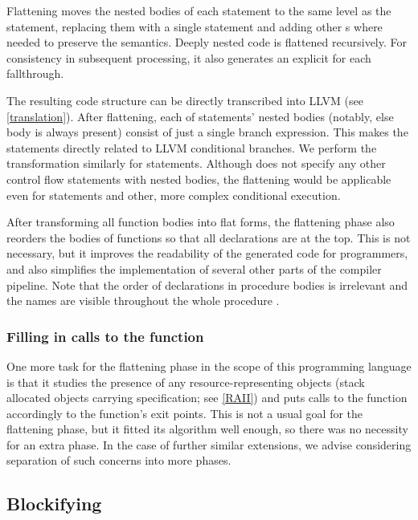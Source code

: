 Flattening moves the nested bodies of each  statement to the same level as the  statement, replacing them with a single  statement and adding other s where needed to preserve the semantics. Deeply nested code is flattened recursively. For consistency in subsequent processing, it also generates an explicit  for each fallthrough.

The resulting code structure can be directly transcribed into LLVM (see \cref{translation}). After flattening, each of  statements' nested bodies (notably, else body is always present) consist of just a single branch expression. This makes the  statements directly related to LLVM conditional branches. We perform the transformation similarly for  statements. Although \cmm does not specify any other control flow statements with nested bodies, the flattening would be applicable even for  statements and other, more complex conditional execution.

After transforming all function bodies into flat forms, the flattening phase also reorders the bodies of functions so that all declarations are at the top. This is not necessary, but it improves the readability of the generated code for programmers, and also simplifies the implementation of several other parts of the compiler pipeline. Note that the order of declarations in procedure bodies is irrelevant and the names are visible throughout the whole procedure \cite{ramsey2005c}.

\subsubsection{Filling in calls to the  function}

One more task for the flattening phase in the scope of this programming language is that it studies the presence of any resource-representing objects (stack allocated objects carrying  specification; see \cref{RAII}) and puts calls to the  function accordingly to the function's exit points. This is not a usual goal for the flattening phase, but it fitted its algorithm well enough, so there was no necessity for an extra phase. In the case of further similar extensions, we advise considering separation of such concerns into more phases.

\subsection{Blockifying}
\label{sec:blockify}

